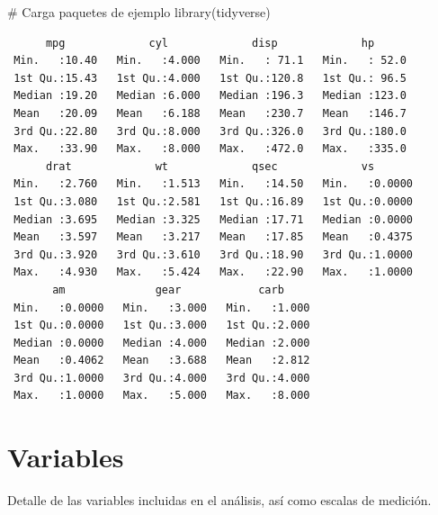 \documentclass[
  spanish,
  a4paper,
  oneside]{scrbook}
\newenvironment{Shaded}{\begin{snugshade}}{\end{snugshade}}
\newcommand{\CommentTok}[1]{\textcolor[rgb]{0.37,0.37,0.37}{#1}}
\newcommand{\FunctionTok}[1]{\textcolor[rgb]{0.28,0.35,0.67}{#1}}
\newcommand{\NormalTok}[1]{\textcolor[rgb]{0.00,0.23,0.31}{#1}}
\begin{document}
\begin{Shaded}
\begin{Highlighting}[]
\CommentTok{\# Carga paquetes de ejemplo}
\FunctionTok{library}\NormalTok{(tidyverse)}
\end{Highlighting}
\end{Shaded}

\begin{verbatim}
      mpg             cyl             disp             hp       
 Min.   :10.40   Min.   :4.000   Min.   : 71.1   Min.   : 52.0  
 1st Qu.:15.43   1st Qu.:4.000   1st Qu.:120.8   1st Qu.: 96.5  
 Median :19.20   Median :6.000   Median :196.3   Median :123.0  
 Mean   :20.09   Mean   :6.188   Mean   :230.7   Mean   :146.7  
 3rd Qu.:22.80   3rd Qu.:8.000   3rd Qu.:326.0   3rd Qu.:180.0  
 Max.   :33.90   Max.   :8.000   Max.   :472.0   Max.   :335.0  
      drat             wt             qsec             vs        
 Min.   :2.760   Min.   :1.513   Min.   :14.50   Min.   :0.0000  
 1st Qu.:3.080   1st Qu.:2.581   1st Qu.:16.89   1st Qu.:0.0000  
 Median :3.695   Median :3.325   Median :17.71   Median :0.0000  
 Mean   :3.597   Mean   :3.217   Mean   :17.85   Mean   :0.4375  
 3rd Qu.:3.920   3rd Qu.:3.610   3rd Qu.:18.90   3rd Qu.:1.0000  
 Max.   :4.930   Max.   :5.424   Max.   :22.90   Max.   :1.0000  
       am              gear            carb      
 Min.   :0.0000   Min.   :3.000   Min.   :1.000  
 1st Qu.:0.0000   1st Qu.:3.000   1st Qu.:2.000  
 Median :0.0000   Median :4.000   Median :2.000  
 Mean   :0.4062   Mean   :3.688   Mean   :2.812  
 3rd Qu.:1.0000   3rd Qu.:4.000   3rd Qu.:4.000  
 Max.   :1.0000   Max.   :5.000   Max.   :8.000  
\end{verbatim}

\section{Variables}\label{variables}

Detalle de las variables incluidas en el análisis, así como escalas de
medición.
\end{document}
